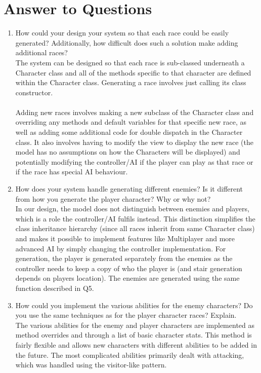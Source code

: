 \documentclass[12pt]{article}
\begin{document}
\section*{Answer to Questions}
\begin{enumerate}
\item How could your design your system so that each race could be easily generated? Additionally, how difficult does such a solution make adding additional races?\\

The system can be designed so that each race is sub-classed underneath a Character class and all of the methods specific to that character are defined within the Character class. Generating a race involves just calling its class constructor. \\
\\
Adding new races involves making a new subclass of the Character class and overriding any methods and default variables for that specific new race, as well as adding some additional code for double dispatch in the Character class. It also involves having to modify the view to display the new race (the model has no assumptions on how the Characters will be displayed) and potentially modifying the controller/AI if the player can play as that race or if the race has special AI behaviour. 

\item How does your system handle generating different enemies? Is it different from how you generate the player character? Why or why not? \\


In our design, the model does not distinguish between enemies and players, which is a role the controller/AI fulfils instead. This distinction simplifies the class inheritance hierarchy (since all races inherit from same Character class) and makes it possible to implement features like Multiplayer and more advanced AI by simply changing the controller implementation. For generation, the player is generated separately from the enemies as the controller needs to keep a copy of who the player is (and stair generation depends on players location). The enemies are generated using the same function described in Q5.

\item How could you implement the various abilities for the enemy characters? Do you use the same techniques as for the player character races? Explain.\\


The various abilities for the enemy and player characters are implemented as method overrides and through a list of basic character stats. This method is fairly flexible and allows new characters with different abilities to be added in the future. The most complicated abilities primarily dealt with attacking, which was handled using the visitor-like pattern.



\end{enumerate}
\end{document}
